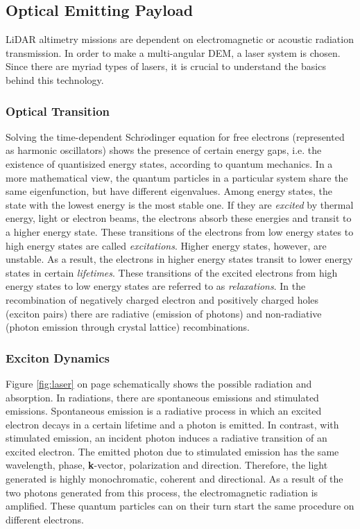 \subsection{Optical Emitting Payload}
	\label{mtDOLSR}
\acs{LiDAR} altimetry missions are dependent on electromagnetic or acoustic radiation transmission. In order to make a multi-angular \acs{DEM}, a \ac{laser} system is chosen. Since there are myriad types of \acs{laser}s, it is crucial to understand the basics behind this technology.  

	\subsubsection{Optical Transition}
\cite{laser_fundamental}Solving the time-dependent Schr$\ddot{o}$dinger equation for free electrons (represented as harmonic oscillators) shows the presence of certain energy gaps, i.e. the existence of quantisized energy states, according to quantum mechanics. In a more mathematical view, the quantum particles in a particular system share the same eigenfunction, but have different eigenvalues. Among energy states, the state with the lowest energy is the most stable one. If they are \textit{excited} by thermal energy, light or electron beams, the electrons absorb these energies and transit to a higher energy state. These transitions of the electrons from low energy states to high energy states are called \textit{excitations}. Higher energy states, however, are unstable. As a result, the electrons in higher energy states transit to lower energy states in certain \textit{lifetimes}. These transitions of the excited electrons from high energy states to low energy states are referred to as \textit{relaxations}. In the recombination of negatively charged electron and positively charged holes (exciton pairs) there are radiative (emission of photons) and non-radiative (photon emission through crystal lattice) recombinations.

	\subsubsection{Exciton Dynamics}   
Figure \ref{fig:laser} on page \pageref{fig:laser} schematically shows the possible radiation and absorption. In radiations, there are spontaneous emissions and stimulated emissions. Spontaneous emission is a radiative process in which an excited electron decays in a certain lifetime and a photon is emitted. In contrast, with stimulated emission, an incident photon induces a radiative transition of an excited electron. The emitted photon due to stimulated emission has the same wavelength, phase, \textbf{k}-vector, polarization and direction. Therefore, the light generated is highly monochromatic, coherent and directional. As a result of the two photons generated from this process, the electromagnetic radiation is amplified. These quantum particles can on their turn start the same procedure on different electrons. 

